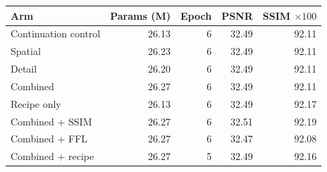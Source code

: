 \noindent\begin{minipage}{\linewidth}
\centering\small\setlength{\tabcolsep}{4pt}
\label{tab:jointval}
\begin{tabular}{@{}lrrrr@{}}\toprule
Arm & Params (M)& Epoch & PSNR & SSIM $\times100$\\\midrule
Continuation control &26.13&6&32.49&92.11\\
Spatial &26.23&6&32.49&92.11\\
Detail &26.20&6&32.49&92.11\\
Combined &26.27&6&32.49&92.11\\
Recipe only &26.13&6&32.49&92.17\\
Combined + SSIM &26.27&6&32.51&92.19\\
Combined + FFL &26.27&6&32.47&92.08\\
Combined + recipe &26.27&5&32.49&92.16\\
\bottomrule\end{tabular}
\end{minipage}
